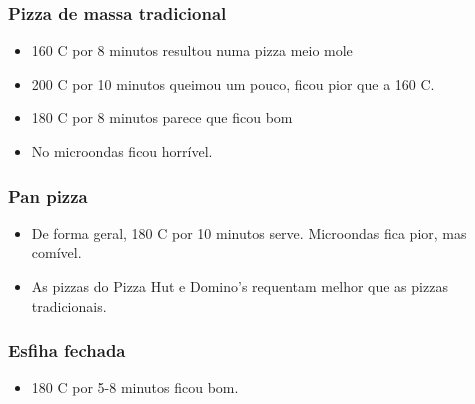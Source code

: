 \subsubsection*{Pizza de massa tradicional}
\begin{itemize}
	\item 160 \grau C por 8 minutos resultou numa pizza meio mole
	\item 200 \grau C por 10 minutos queimou um pouco, ficou pior que a 160 \grau C.
	\item 180 \grau C por 8 minutos parece que ficou bom
	\item No microondas ficou horrível.
\end{itemize}

\subsubsection*{Pan pizza}
\begin{itemize}
	\item De forma geral, 180 \grau C por 10 minutos serve. Microondas fica pior, mas comível.
	\item As pizzas do Pizza Hut e Domino's requentam melhor que as pizzas tradicionais.
\end{itemize}

\subsubsection*{Esfiha fechada}
\begin{itemize}
	\item 180 \grau C por 5-8 minutos ficou bom.
\end{itemize}

